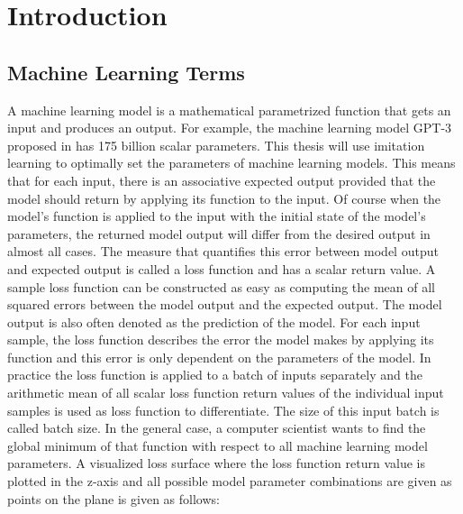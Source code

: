 \documentclass[draft,final]{vutinfth} %
\begin{document}

    \tableofcontents %

    \mainmatter

    \chapter{Introduction}

    \section{Machine Learning Terms}
    A machine learning model is a mathematical parametrized function that gets an input and produces an output.
    For example, the machine learning model GPT-3 proposed in \cite{GPT-3} has 175 billion scalar parameters.
    This thesis will use imitation learning to optimally set the parameters of machine learning models.
    This means that for each input, there is an associative expected output provided that the model should return by applying its function to the input.
    Of course when the model's function is applied to the input with the initial state of the model's parameters, the returned model output will differ from the desired output in almost all cases.
    The measure that quantifies this error between model output and expected output is called a loss function and has a scalar return value.
    A sample loss function can be constructed as easy as computing the mean of all squared errors between the model output and the expected output.
    The model output is also often denoted as the prediction of the model.
    For each input sample, the loss function describes the error the model makes by applying its function and this error is only dependent on the parameters of the model.
    In practice the loss function is applied to a batch of inputs separately and the arithmetic mean of all scalar loss function return values of the individual input samples is used as loss function to differentiate.
    The size of this input batch is called batch size.
    In the general case, a computer scientist wants to find the global minimum of that function with respect to all machine learning model parameters.
    A visualized loss surface where the loss function return value is plotted in the z-axis and all possible model parameter combinations are given as points on the plane is given as follows:
\end{document}
